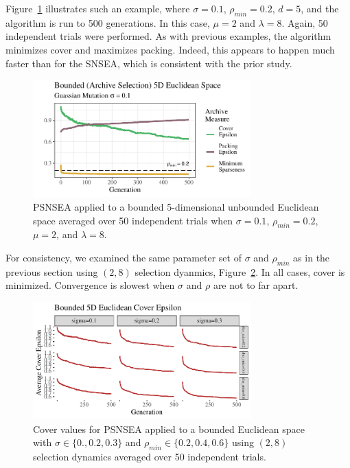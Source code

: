 \documentclass[twoside]{article}
\begin{document}
Figure~\ref{fig:bounded:mu2lam8:0102} illustrates such an example, where $\sigma=0.1$, $\rho_{min}= 0.2$, $d=5$, and the algorithm is run to 500 generations.  In this case, $\mu=2$ and $\lambda=8$.  Again, 50 independent trials were performed.  As with previous examples, the algorithm minimizes cover and maximizes packing.  Indeed, this appears to happen much faster than for the SNSEA, which is consistent with the prior study.
%
\begin{figure}[h]
  \center\includegraphics[width=0.75\textwidth]{Figures/bounded-500-s01r02-mu2lam8.pdf}
  \caption{\label{fig:bounded:mu2lam8:0102} PSNSEA applied to a bounded 5-dimensional unbounded Euclidean space averaged over 50 independent trials when $\sigma=0.1$, $\rho_{min}=0.2$, $\mu=2$, and $\lambda=8$.}
\end{figure}

For consistency, we examined the same parameter set of $\sigma$ and $\rho_{min}$ as in the previous section using $(2,8)$ selection dyanmics, Figure~\ref{fig:bounded:mu2lam8:sm}.  In all cases, cover is minimized.  Convergence is slowest when $\sigma$ and $\rho$ are not to far apart.
%
\begin{figure}[t]
  \center\includegraphics[width=0.75\textwidth]{Figures/bounded-500-sm-mu2lam8.pdf}
  \caption{\label{fig:bounded:mu2lam8:sm} Cover values for PSNSEA applied to a bounded Euclidean space with $\sigma\in\{0.,  0.2, 0.3\}$ and $\rho_{min} \in \{0.2, 0.4, 0.6\}$ using $(2,8)$ selection dynamics averaged over 50 independent trials.}
\end{figure}
\end{document}
